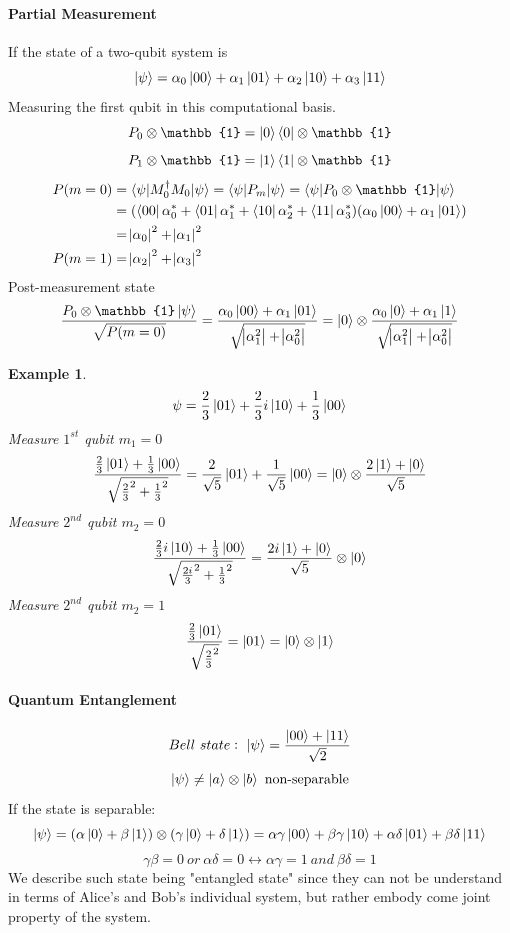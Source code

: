 \documentclass[]{book}
\newtheorem*{example}{Example}
\theoremstyle{nonumberplain}
\begin{document}
\paragraph{Partial Measurement} \label{par:partial_measurement}
If the state of a two-qubit system is
\[
\ket{\psi}=\alpha_{0}\ket{00}+\alpha_{1}\ket{01}+\alpha_{2}\ket{10}+\alpha_{3}\ket{11}
\] 
Measuring the first qubit in this computational basis.
\[
	P_{0}\otimes  \mathbb{1} = \ket{0}\bra{0}\otimes \mathbb{1}
\] 
\[
	P_{1}\otimes \mathbb{1} = \ket{1}\bra{1}\otimes \mathbb{1}
\] 
\begin{equation*}
\begin{aligned}
	P(m=0) &= \braket{\psi|M_{0}^{\dagger}M_{0}|\psi} = \braket{\psi|P_{m}|\psi} = \braket{\psi|P_{0}\otimes \mathbb{1}|\psi } \\
			 &=(\bra{00}\alpha_{0}^{*}+\bra{01}\alpha_{1}^{*}+\bra{10}\alpha_{2}^{*}+\bra{11}\alpha_{3}^{*})(\alpha_{0}\ket{00}+\alpha_{1}\ket{01})\\
			 &= \abs{\alpha_{0}}^{2}+\abs{\alpha_{1}}^{2} \\
	P(m=1) &= \abs{\alpha_{2}}^{2}+\abs{\alpha_{3}}^{2}
\end{aligned}
\end{equation*}
Post-measurement state
\[
	\frac{P_{0}\otimes\mathbb{1}\ket{\psi}}{\sqrt{P(m=0)}} = \frac{\alpha_{0}\ket{00}+\alpha_{1}\ket{01}}{\sqrt{\abs{\alpha_{1}^{2}}+\abs{\alpha_{0}^{2}}}} = \ket{0}\otimes\frac{\alpha_{0}\ket{0}+\alpha_{1}\ket{1}}{\sqrt{\abs{\alpha_{1}^{2}}+\abs{\alpha_{0}^{2}}}} 
\] 
\begin{example}
\[
\psi = \frac{2}{3}\ket{01}+\frac{2}{3}i\ket{10}+\frac{1}{3}\ket{00}
\] 
Measure $1^{st}$ qubit $m_{1}=0$ 
\[
\frac{\frac{2}{3}\ket{01}+\frac{1}{3}\ket{00}}{\sqrt{\frac{2}{3}^{2}+\frac{1}{3}^{2}}} = \frac{2}{\sqrt{5}}\ket{01}+\frac{1}{\sqrt{5}}\ket{00} = \ket{0}\otimes \frac{2\ket{1}+\ket{0}}{\sqrt{5}}
\] 
Measure $2^{nd}$ qubit $m_{2}=0$
\[
\frac{\frac{2}{3}i\ket{10}+\frac{1}{3}\ket{00}}{\sqrt{\frac{2i}{3}^{2}+\frac{1}{3}^{2}}}= \frac{2i\ket{1}+\ket{0}}{\sqrt{5}}\otimes \ket{0}
\] 
Measure $2^{nd}$ qubit $m_{2}=1$
\[
	\frac{\frac{2}{3}\ket{01}}{\sqrt{\frac{2}{3}^{2}}}=\ket{01}=\ket{0}\otimes\ket{1} 
\] 
\end{example}
\paragraph{Quantum Entanglement}%
\label{par:quantum_entanglement}
\[
Bell\ state:\ \ket{\psi}=\frac{\ket{00}+\ket{11}}{\sqrt{2}}
\] 
\[
\ket{\psi}\neq \ket{a}\otimes \ket{b}\ \text{non-separable}
\] 
If the state is separable:
\[
	\ket{\psi} = (\alpha\ket{0}+\beta\ket{1})\otimes(\gamma\ket{0}+\delta\ket{1}) = \alpha\gamma\ket{00}+\beta\gamma\ket{10}+\alpha\delta\ket{01}+\beta\delta\ket{11}
\] 
\[
\gamma\beta =  0 \  or \ \alpha\delta=0 \leftrightarrow \alpha\gamma =1 \ and \ \beta\delta = 1
\] 
We describe such state being "entangled state" since they can not be understand in terms of Alice's and Bob's individual system, but rather embody come joint property of the system.\\
\end{document}
